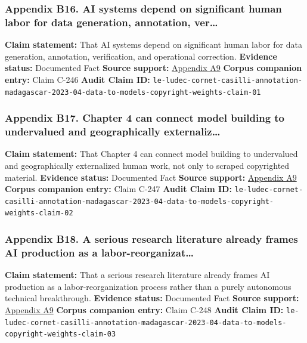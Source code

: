 \documentclass[
  american,
  11pt,
  letterpaper,
]{article}
\begin{document}
\subsubsection{Appendix B16. AI systems depend on significant human
labor for data generation, annotation,
ver\ldots{}}\label{ch-04-appendix-b16-ai-systems-depend-on-significant-human-labor-for-data-generation-annotation-ver}

\textbf{Claim statement:} That AI systems depend on significant human
labor for data generation, annotation, verification, and operational
correction. \textbf{Evidence status:} Documented Fact \textbf{Source
support:}
\hyperref[ch-04-appendix-a9-the-problem-with-annotation-human-labour-and-outsourcing-between-france-and-madagascar]{Appendix
A9} \textbf{Corpus companion entry:} Claim C-246 \textbf{Audit Claim
ID:}
\texttt{le-ludec-cornet-casilli-annotation-madagascar-2023-04-data-to-models-copyright-weights-claim-01}

\subsubsection{Appendix B17. Chapter 4 can connect model building to
undervalued and geographically
externaliz\ldots{}}\label{ch-04-appendix-b17-chapter-4-can-connect-model-building-to-undervalued-and-geographically-externaliz}

\textbf{Claim statement:} That Chapter 4 can connect model building to
undervalued and geographically externalized human work, not only to
scraped copyrighted material. \textbf{Evidence status:} Documented Fact
\textbf{Source support:}
\hyperref[ch-04-appendix-a9-the-problem-with-annotation-human-labour-and-outsourcing-between-france-and-madagascar]{Appendix
A9} \textbf{Corpus companion entry:} Claim C-247 \textbf{Audit Claim
ID:}
\texttt{le-ludec-cornet-casilli-annotation-madagascar-2023-04-data-to-models-copyright-weights-claim-02}

\subsubsection{Appendix B18. A serious research literature already
frames AI production as a
labor-reorganizat\ldots{}}\label{ch-04-appendix-b18-a-serious-research-literature-already-frames-ai-production-as-a-labor-reorganizat}

\textbf{Claim statement:} That a serious research literature already
frames AI production as a labor-reorganization process rather than a
purely autonomous technical breakthrough. \textbf{Evidence status:}
Documented Fact \textbf{Source support:}
\hyperref[ch-04-appendix-a9-the-problem-with-annotation-human-labour-and-outsourcing-between-france-and-madagascar]{Appendix
A9} \textbf{Corpus companion entry:} Claim C-248 \textbf{Audit Claim
ID:}
\texttt{le-ludec-cornet-casilli-annotation-madagascar-2023-04-data-to-models-copyright-weights-claim-03}
\end{document}
